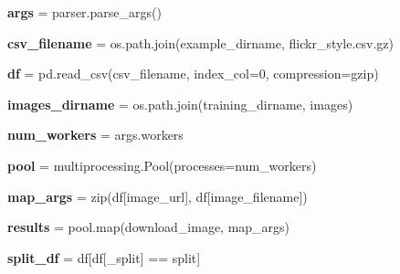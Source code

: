 \begin{DoxyCompactItemize}
{\bfseries args} = parser.\+parse\+\_\+args()
\item 
\mbox{\label{namespaceassemble__data_ae0b018aaebace53e2a3f0d690caae629}} 
{\bfseries csv\+\_\+filename} = os.\+path.\+join(example\+\_\+dirname, \textquotesingle{}flickr\+\_\+style.\+csv.\+gz\textquotesingle{})
\item 
\mbox{\label{namespaceassemble__data_aec48585d01bcb27587d66b11b4ac0d71}} 
{\bfseries df} = pd.\+read\+\_\+csv(csv\+\_\+filename, index\+\_\+col=0, compression=\textquotesingle{}gzip\textquotesingle{})
\item 
\mbox{\label{namespaceassemble__data_aa6e1c0865884b9670128a682e1ccd291}} 
{\bfseries images\+\_\+dirname} = os.\+path.\+join(training\+\_\+dirname, \textquotesingle{}images\textquotesingle{})
\item 
\mbox{\label{namespaceassemble__data_ae02bbd3fa190370b591b0da5f7daac9d}} 
{\bfseries num\+\_\+workers} = args.\+workers
\item 
\mbox{\label{namespaceassemble__data_ac3d3c53ec94f56564da6bbc477c19016}} 
{\bfseries pool} = multiprocessing.\+Pool(processes=num\+\_\+workers)
\item 
\mbox{\label{namespaceassemble__data_ad820ce6ec73dc0bbc0ec65c2b1c10a7a}} 
{\bfseries map\+\_\+args} = zip(df\mbox{[}\textquotesingle{}image\+\_\+url\textquotesingle{}\mbox{]}, df\mbox{[}\textquotesingle{}image\+\_\+filename\textquotesingle{}\mbox{]})
\item 
\mbox{\label{namespaceassemble__data_a8b01c0eac5a9289a23a4923c30a28abd}} 
{\bfseries results} = pool.\+map(download\+\_\+image, map\+\_\+args)
\item 
\mbox{\label{namespaceassemble__data_abf32fbb4d7f53386c30ac9a615eeb292}} 
{\bfseries split\+\_\+df} = df\mbox{[}df\mbox{[}\textquotesingle{}\+\_\+split\textquotesingle{}\mbox{]} == split\mbox{]}
\item 
\mbox{\label{namespaceassemble__data_ad37951b4d9abbf60141b6ea736c30064}} 

\end{DoxyCompactItemize}
